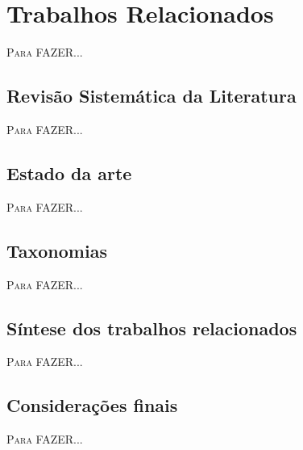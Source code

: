 \chapter{Trabalhos Relacionados} \label{chap:Trabalhos}
\lettrine{P}{ara} FAZER...

\section{Revisão Sistemática da Literatura}
\lettrine{P}{ara} FAZER...

\section{Estado da arte}
\lettrine{P}{ara} FAZER...

\section{Taxonomias}
\lettrine{P}{ara} FAZER...

\section{Síntese dos trabalhos relacionados}
\lettrine{P}{ara} FAZER...

\section{Considerações finais}
\lettrine{P}{ara} FAZER...